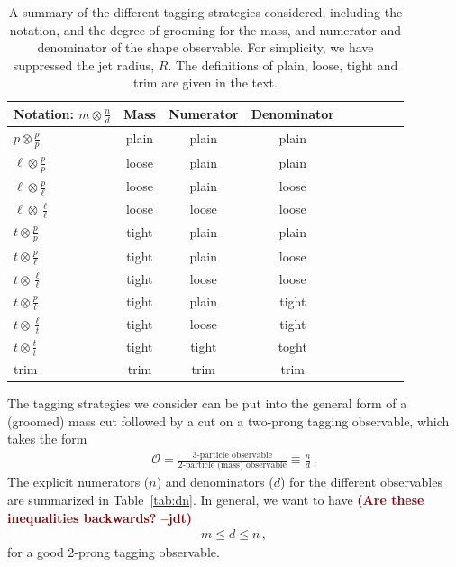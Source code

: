 \documentclass[11pt,letterpaper]{article}
\DeclareRobustCommand{\Tab}[1]{Table~\ref{#1}}
\newcommand{\jdt}[1]{\textbf{\textcolor{darkred}{(#1 --jdt)}}}
\begin{document}
\begin{table}[t!]
\begin{center}
\begin{tabular}{| l | c | c |c |c|c|c |c|r| }
  \hline                       
  Notation: $m \otimes \frac{n}{d}$ & Mass & Numerator & Denominator\\
  \hline
  $p \otimes \frac{p}{p}$ & plain  &  plain & plain \\
  $\ell \otimes \frac{p}{p}$ & loose  &  plain & plain \\
  $\ell \otimes \frac{p}{\ell}$ & loose  &  plain & loose \\
  $\ell \otimes \frac{\ell}{\ell}$ & loose  &  loose & loose \\
  $t \otimes \frac{p}{p}$ & tight  &  plain & plain \\
  $t \otimes \frac{p}{\ell}$ & tight  &  plain & loose \\
  $t \otimes \frac{\ell}{\ell}$ & tight  &  loose & loose \\
  $t \otimes \frac{p}{t}$ & tight  &  plain & tight \\
  $t \otimes \frac{\ell}{t}$ & tight  &  loose & tight \\
  $t \otimes \frac{t}{t}$ & tight  &  tight & toght \\
  \hline
  $\text{trim}$ & trim &  trim & trim \\
  \hline  
\end{tabular}
\end{center}
\caption{ A summary of the different tagging strategies considered,
  including the notation, and the degree of grooming for the mass, and
  numerator and denominator of the shape observable. For simplicity,
  we have suppressed the jet radius, $R$. The definitions of plain,
  loose, tight and trim are given in the text.}
\label{tab:tag_summary}
\end{table}

The tagging strategies we consider can be put into the general form of a (groomed) mass cut followed by a cut on a two-prong tagging observable, which takes the form
%
\begin{align}
\mathcal{O}=\frac{\text{3-particle observable}}{\text{2-particle (mass) observable}} \equiv \frac{n}{d}\,.
\end{align}
%
The explicit numerators ($n$) and denominators ($d$) for the different observables are summarized in \Tab{tab:dn}.
%
In general, we want to have \jdt{Are these inequalities backwards?}
\begin{align}
m \leq d \leq n\,,
\end{align}
for a good 2-prong tagging observable.
%
\end{document}
